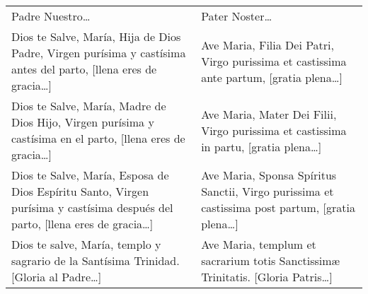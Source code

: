 \documentclass[./rosary.tex]{subfiles}
\begin{document}
\label{final-prayer}

\begin{longtable} { p{} p{} }
    Padre Nuestro{\ldots}
        &
    Pater Noster{\ldots}\\

    Dios te Salve, María, Hija de Dios Padre, Virgen purísima y castísima antes del parto, [llena eres de gracia{\ldots}]
        &
    Ave Maria, Filia Dei Patri, Virgo purissima et castissima ante partum, [gratia plena{\ldots}]\\

    Dios te Salve, María, Madre de Dios Hijo, Virgen purísima y castísima en el parto, [llena eres de gracia{\ldots}]
        &
    Ave Maria, Mater Dei Filii, Virgo purissima et castissima in partu, [gratia plena{\ldots}]\\

    Dios te Salve, María, Esposa de Dios Espíritu Santo, Virgen purísima y castísima después del parto, [llena eres de gracia{\ldots}]
        &
    Ave Maria, Sponsa Spíritus Sanctii, Virgo purissima et castissima post partum, [gratia plena{\ldots}]\\        
    

    Dios te salve, María, templo y sagrario de la Santísima Trinidad. [Gloria al Padre{\ldots}]
        &
    Ave Maria, templum et sacrarium totis Sanctissimæ Trinitatis. [Gloria Patris{\ldots}]
\end{longtable}
\end{document}
